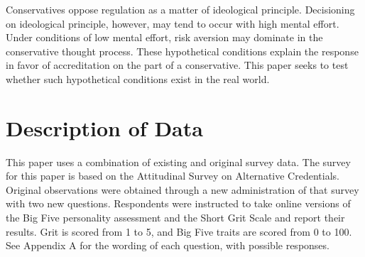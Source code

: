 \documentclass[review]{elsarticle}
\begin{document}
Conservatives oppose regulation as a matter of ideological principle\cite{teghtsoonian1993neo}.
Decisioning on ideological principle, however, may tend to occur with high mental effort.
Under conditions of low mental effort, risk aversion may dominate in the conservative thought process.
These hypothetical conditions explain the response in favor of accreditation on the part of a conservative.
This paper seeks to test whether such hypothetical conditions exist in the real world.


\section{Description of Data}

This paper uses a combination of existing and original survey data.
The survey for this paper is based on the Attitudinal Survey on Alternative Credentials\cite{dataset_vandivier}.
Original observations were obtained through a new administration of that survey with two new questions.
Respondents were instructed to take online versions of the Big Five personality assessment and the Short Grit Scale and report their results.
Grit is scored from 1 to 5, and Big Five traits are scored from 0 to 100.
See Appendix A for the wording of each question, with possible responses.
\end{document}
